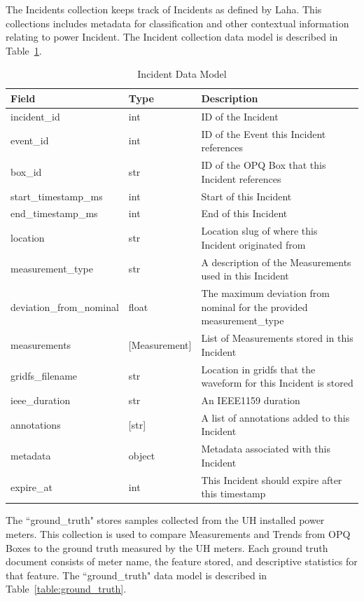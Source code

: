 The Incidents collection keeps track of Incidents as defined by Laha. This collections includes metadata for classification and other contextual information relating to power Incident. The Incident collection data model is described in Table~\ref{table:Incidents}.

\begin{table}[H]
	\centering
	\caption{Incident Data Model}
	\begin{tabularx}{\textwidth}{llX}
		\toprule
		\textbf{Field} & \textbf{Type} & \textbf{Description} \\
		\midrule
		incident\_id & int & ID of the Incident \\
		event\_id & int & ID of the Event this Incident references \\
		box\_id & str & ID of the OPQ Box that this Incident references \\
		start\_timestamp\_ms & int & Start of this Incident \\
		end\_timestamp\_ms & int & End of this Incident \\
		location & str & Location slug of where this Incident originated from \\
		measurement\_type & str & A description of the Measurements used in this Incident \\
		deviation\_from\_nominal & float & The maximum deviation from nominal for the provided measurement\_type \\
		measurements & [Measurement] & List of Measurements stored in this Incident \\
		gridfs\_filename & str & Location in gridfs that the waveform for this Incident is stored \\
		ieee\_duration & str & An IEEE1159 duration \\
		annotations & [str] & A list of annotations added to this Incident \\
		metadata & object & Metadata associated with this Incident \\
		expire\_at & int & This Incident should expire after this timestamp \\
		\bottomrule
	\end{tabularx}
	\label{table:Incidents}
\end{table}

The ``ground\_truth" stores samples collected from the UH installed power meters. This collection is used to compare Measurements and Trends from OPQ Boxes to the ground truth measured by the UH meters. Each ground truth document consists of meter name, the feature stored, and descriptive statistics for that feature. The ``ground\_truth" data model is described in Table~\ref{table:ground_truth}.

